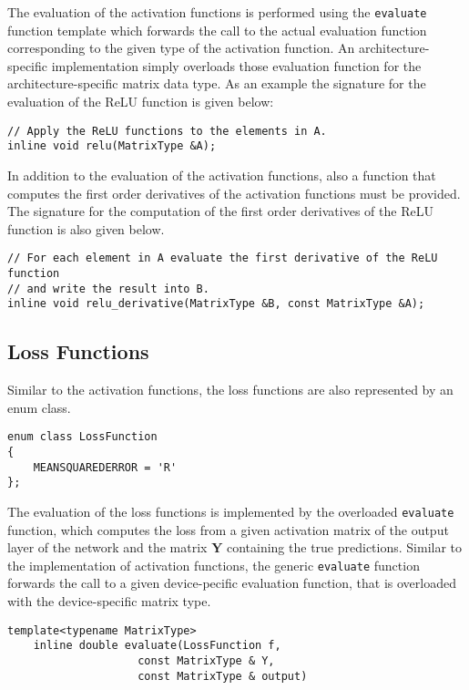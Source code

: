 \documentclass[a4paper,11pt,bibtotoc,xcolor=dvipsnames]{scrartcl}
\newcommand*{\code}[1]{\texttt{#1}}
\begin{document}
The evaluation of the activation functions is performed using the
\code{evaluate} function template which forwards the call to the
actual evaluation function corresponding to the given type of the
activation function. An architecture-specific implementation simply
overloads those evaluation function for the architecture-specific
matrix data type. As an example the signature for the evaluation of
the ReLU function is given below:

\begin{verbatim}
// Apply the ReLU functions to the elements in A.
inline void relu(MatrixType &A);
\end{verbatim}

In addition to the evaluation of the activation functions, also a function that
 computes the first order derivatives of the activation functions must be provided.
 The signature for the computation of the first order derivatives of the ReLU
 function is also given below.

\begin{verbatim}
// For each element in A evaluate the first derivative of the ReLU function
// and write the result into B.
inline void relu_derivative(MatrixType &B, const MatrixType &A);
\end{verbatim}

\subsection{Loss Functions}

Similar to the activation functions, the loss functions are also represented by an
enum class.

\begin{verbatim}
enum class LossFunction
{
    MEANSQUAREDERROR = 'R'
};
\end{verbatim}

The evaluation of the loss functions is implemented by the overloaded
 \code{evaluate} function, which computes the loss from a given activation
matrix of the output layer of the network and the matrix $\mathbf{Y}$ containing
the true predictions. Similar to the implementation of activation functions,
the generic \code{evaluate} function forwards the call to a given
 device-pecific evaluation function, that is overloaded with the device-specific
 matrix type.

\begin{verbatim}
template<typename MatrixType>
    inline double evaluate(LossFunction f,
                    const MatrixType & Y,
                    const MatrixType & output)
\end{verbatim}
\end{document}

